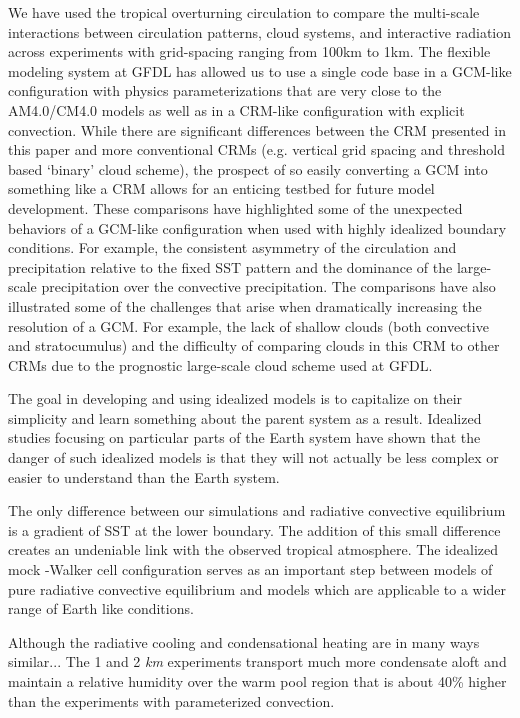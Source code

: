 \documentclass[draft]{agujournal2019}
\begin{document}
We have used the tropical overturning circulation to compare the multi-scale interactions between circulation patterns, cloud 
systems, and interactive radiation across experiments with grid-spacing ranging from 100km to 1km.  The flexible modeling
system at GFDL has allowed us to use a single code base in a GCM-like configuration with physics parameterizations 
that are very close to the AM4.0/CM4.0 models as well as in a CRM-like configuration with explicit convection.  While 
there are significant differences between the CRM presented in this paper and more conventional CRMs (e.g. vertical 
grid spacing and threshold based `binary' cloud scheme), the prospect of so easily converting a GCM into something 
like a CRM allows for an enticing testbed for future model development.
These comparisons have highlighted some of the unexpected behaviors of a GCM-like configuration when used with 
highly idealized boundary conditions.  For example, the consistent asymmetry of the circulation and precipitation relative 
to the fixed SST pattern and the dominance of the large-scale precipitation over the convective precipitation.  
The comparisons have also illustrated some 
of the challenges that arise when dramatically increasing the resolution of a GCM.  For example, the lack of shallow 
clouds (both convective and stratocumulus) and the difficulty of comparing clouds in this CRM to other CRMs due to the 
prognostic large-scale cloud scheme used at GFDL.

The goal in developing and using idealized models is to capitalize on their simplicity and learn something about the 
parent system as a result.  Idealized studies focusing on particular parts of the Earth system have shown that the danger of 
such idealized models is that they will not actually be less complex or easier to understand than the Earth system.  

The only difference between our simulations and radiative convective equilibrium is a gradient of SST at the lower boundary.
The addition of this small difference creates an undeniable link with the observed tropical atmosphere.  The idealized 
mock -Walker cell configuration serves as an important step between models of pure radiative convective equilibrium
and models which are applicable to a wider range of Earth like conditions.  


Although the radiative cooling and condensational heating
 are in many ways similar...   The 1 and 2 \textit{km} experiments transport much more condensate aloft and maintain a 
 relative humidity over the warm pool region that is about 40\% higher than the experiments with parameterized convection.
\end{document}
